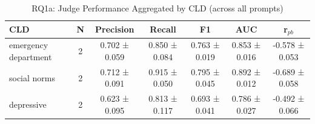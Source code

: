 \begin{table}[htbp]
\centreing
\caption{RQ1a: Judge Performance Aggregated by CLD (across all prompts)}
\label{tab:rq1a_by_cld}
\begin{tabular}{lcccccc}
\toprule
\textbf{CLD} & \textbf{N} & \textbf{Precision} & \textbf{Recall} & \textbf{F1} & \textbf{AUC} & \textbf{r$_{pb}$} \\
\midrule
emergency department & 2 & 0.702 ± 0.059 & 0.850 ± 0.084 & 0.763 ± 0.019 & 0.853 ± 0.016 & -0.578 ± 0.053 \\
social norms & 2 & 0.712 ± 0.091 & 0.915 ± 0.050 & 0.795 ± 0.045 & 0.892 ± 0.012 & -0.689 ± 0.058 \\
depressive & 2 & 0.623 ± 0.095 & 0.813 ± 0.117 & 0.693 ± 0.041 & 0.786 ± 0.027 & -0.492 ± 0.066 \\
\bottomrule
\end{tabular}
\end{table}